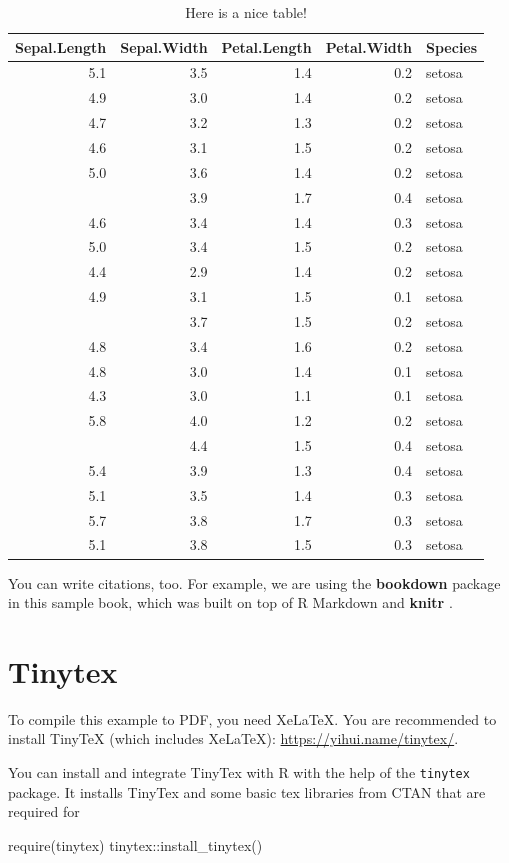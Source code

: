 \documentclass[
  fontsize=13pt,
  english,
  a4paper,
  openany, a4paper, oneside]{book}
\newenvironment{Shaded}{\begin{snugshade}}{\end{snugshade}}
\newcommand{\FunctionTok}[1]{\textcolor[rgb]{0.00,0.00,0.00}{#1}}
\newcommand{\NormalTok}[1]{#1}
\newcommand{\SpecialCharTok}[1]{\textcolor[rgb]{0.00,0.00,0.00}{#1}}
\begin{document}
\begin{table}

\caption{\label{tab:nicetab}Here is a nice table!}
\centering
\begin{tabular}[t]{rrrrl}
\toprule
Sepal.Length & Sepal.Width & Petal.Length & Petal.Width & Species\\
\midrule
5.1 & 3.5 & 1.4 & 0.2 & setosa\\
4.9 & 3.0 & 1.4 & 0.2 & setosa\\
4.7 & 3.2 & 1.3 & 0.2 & setosa\\
4.6 & 3.1 & 1.5 & 0.2 & setosa\\
5.0 & 3.6 & 1.4 & 0.2 & setosa\\
\addlinespace
5.4 & 3.9 & 1.7 & 0.4 & setosa\\
4.6 & 3.4 & 1.4 & 0.3 & setosa\\
5.0 & 3.4 & 1.5 & 0.2 & setosa\\
4.4 & 2.9 & 1.4 & 0.2 & setosa\\
4.9 & 3.1 & 1.5 & 0.1 & setosa\\
\addlinespace
5.4 & 3.7 & 1.5 & 0.2 & setosa\\
4.8 & 3.4 & 1.6 & 0.2 & setosa\\
4.8 & 3.0 & 1.4 & 0.1 & setosa\\
4.3 & 3.0 & 1.1 & 0.1 & setosa\\
5.8 & 4.0 & 1.2 & 0.2 & setosa\\
\addlinespace
5.7 & 4.4 & 1.5 & 0.4 & setosa\\
5.4 & 3.9 & 1.3 & 0.4 & setosa\\
5.1 & 3.5 & 1.4 & 0.3 & setosa\\
5.7 & 3.8 & 1.7 & 0.3 & setosa\\
5.1 & 3.8 & 1.5 & 0.3 & setosa\\
\bottomrule
\end{tabular}
\end{table}

You can write citations, too. For example, we are using the \textbf{bookdown} package \citep{R-bookdown} in this sample book, which was built on top of R Markdown and \textbf{knitr} \citep{xie2015}.

\hypertarget{tinytex}{%
\section{Tinytex}\label{tinytex}}

To compile this example to PDF, you need XeLaTeX. You are recommended to install TinyTeX (which includes XeLaTeX): \url{https://yihui.name/tinytex/}.

You can install and integrate TinyTex with R with the help of the \texttt{tinytex} package. It installs TinyTex and some basic tex libraries from CTAN that are required for

\begin{Shaded}
\begin{Highlighting}[]
\FunctionTok{require}\NormalTok{(tinytex)}
\NormalTok{tinytex}\SpecialCharTok{::}\FunctionTok{install\_tinytex}\NormalTok{()}
\end{Highlighting}
\end{Shaded}


  
\end{document}
